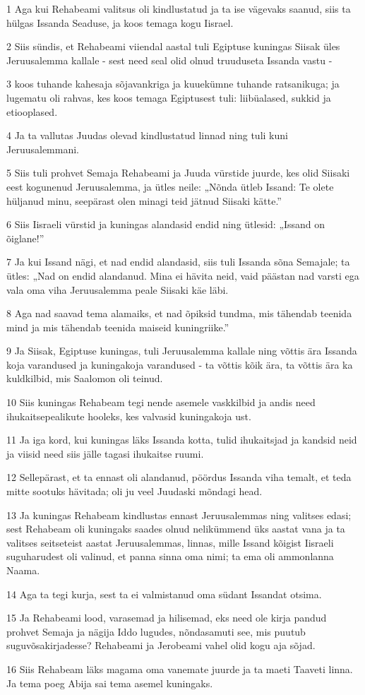 \par 1 Aga kui Rehabeami valitsus oli kindlustatud ja ta ise vägevaks saanud, siis ta hülgas Issanda Seaduse, ja koos temaga kogu Iisrael.
\par 2 Siis sündis, et Rehabeami viiendal aastal tuli Egiptuse kuningas Siisak üles Jeruusalemma kallale - sest need seal olid olnud truuduseta Issanda vastu -
\par 3 koos tuhande kahesaja sõjavankriga ja kuuekümne tuhande ratsanikuga; ja lugematu oli rahvas, kes koos temaga Egiptusest tuli: liibüalased, sukkid ja etiooplased.
\par 4 Ja ta vallutas Juudas olevad kindlustatud linnad ning tuli kuni Jeruusalemmani.
\par 5 Siis tuli prohvet Semaja Rehabeami ja Juuda vürstide juurde, kes olid Siisaki eest kogunenud Jeruusalemma, ja ütles neile: „Nõnda ütleb Issand: Te olete hüljanud minu, seepärast olen minagi teid jätnud Siisaki kätte.”
\par 6 Siis Iisraeli vürstid ja kuningas alandasid endid ning ütlesid: „Issand on õiglane!”
\par 7 Ja kui Issand nägi, et nad endid alandasid, siis tuli Issanda sõna Semajale; ta ütles: „Nad on endid alandanud. Mina ei hävita neid, vaid päästan nad varsti ega vala oma viha Jeruusalemma peale Siisaki käe läbi.
\par 8 Aga nad saavad tema alamaiks, et nad õpiksid tundma, mis tähendab teenida mind ja mis tähendab teenida maiseid kuningriike.”
\par 9 Ja Siisak, Egiptuse kuningas, tuli Jeruusalemma kallale ning võttis ära Issanda koja varandused ja kuningakoja varandused - ta võttis kõik ära, ta võttis ära ka kuldkilbid, mis Saalomon oli teinud.
\par 10 Siis kuningas Rehabeam tegi nende asemele vaskkilbid ja andis need ihukaitsepealikute hooleks, kes valvasid kuningakoja ust.
\par 11 Ja iga kord, kui kuningas läks Issanda kotta, tulid ihukaitsjad ja kandsid neid ja viisid need siis jälle tagasi ihukaitse ruumi.
\par 12 Sellepärast, et ta ennast oli alandanud, pöördus Issanda viha temalt, et teda mitte sootuks hävitada; oli ju veel Juudaski mõndagi head.
\par 13 Ja kuningas Rehabeam kindlustas ennast Jeruusalemmas ning valitses edasi; sest Rehabeam oli kuningaks saades olnud nelikümmend üks aastat vana ja ta valitses seitseteist aastat Jeruusalemmas, linnas, mille Issand kõigist Iisraeli suguharudest oli valinud, et panna sinna oma nimi; ta ema oli ammonlanna Naama.
\par 14 Aga ta tegi kurja, sest ta ei valmistanud oma südant Issandat otsima.
\par 15 Ja Rehabeami lood, varasemad ja hilisemad, eks need ole kirja pandud prohvet Semaja ja nägija Iddo lugudes, nõndasamuti see, mis puutub suguvõsakirjadesse? Rehabeami ja Jerobeami vahel olid kogu aja sõjad.
\par 16 Siis Rehabeam läks magama oma vanemate juurde ja ta maeti Taaveti linna. Ja tema poeg Abija sai tema asemel kuningaks.

